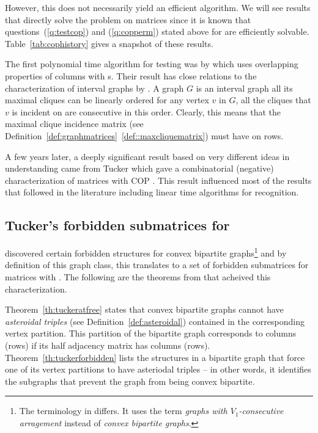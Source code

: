 However, this does not necessarily yield an efficient algorithm. We
will see results that directly solve the problem on matrices since it
is known that questions~(\ref{q:testcop}) and (\ref{q:copperm}) stated
above for \COP are efficiently solvable.  Table~\ref{tab:cophistory}
gives a snapshot of these results.



\tabcophistory

The first polynomial time algorithm for \COP testing was by
\cite{fg65} which uses overlapping properties of columns with \un
s. Their result has close relations to the characterization of
interval graphs by \cite{gh64}. A graph $G$ is an interval graph \iff
all its maximal cliques can be linearly ordered \stt for any vertex
$v$ in $G$, all the cliques that $v$ is incident on are consecutive in
this order. Clearly, this means that the maximal clique incidence
matrix (see
Definition~\ref{def:graphmatrices}~\ref{def::maxcliquematrix}) must
have \COP on rows.

A few years later, a deeply significant result based on very different
ideas in understanding \COP came from Tucker which gave a
combinatorial (negative) characterization of matrices with COP
\cite{at72}. This result influenced most of the \COP results that
followed in the literature including linear time algorithms for \COP
recognition.


\subsection{Tucker's forbidden submatrices for \COP}
\label{sec:tucker}

\cite{at72} discovered certain forbidden structures for convex
bipartite graphs\footnote{The terminology in \cite{at72} differs. It
  uses the term {\em graphs with $V_1$-consecutive arragement} instead
  of {\em convex bipartite graphs}.} and by definition of this graph
class, this translates to a set of forbidden submatrices for matrices
with \cop.  The following are the theorems from \cite{at72} that
acheived this characterization.


Theorem~\ref{th:tuckeratfree} states that convex bipartite graphs
cannot have {\em asteroidal triples} (see
Definition~\ref{def:asteroidal}) contained in the corresponding vertex
partition. This partition of the bipartite graph corresponds to
columns (rows) if its half adjacency matrix has \COP columns (rows).
Theorem~\ref{th:tuckerforbidden} lists the structures in a bipartite
graph that force one of its vertex partitions to have asteriodal
triples -- in other words, it identifies the subgraphs that prevent
the graph from being convex bipartite.

